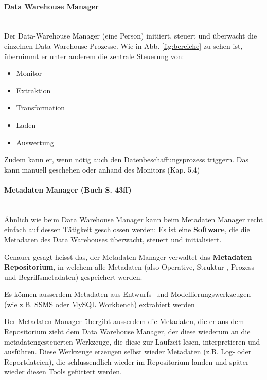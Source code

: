 \documentclass[a4paper, 11pt, nofootinbib]{article}
\begin{document}
\paragraph{Data Warehouse Manager}\mbox{}\\
Der Data-Warehouse Manager (eine Person) initiiert, steuert und überwacht die einzelnen Data Warehouse Prozesse. Wie in Abb. \ref{fig:bereiche} zu sehen ist, übernimmt er unter anderem die zentrale Steuerung von: 

\begin{itemize}
	\item Monitor
	\item Extraktion
	\item Transformation
	\item Laden
	\item Auswertung
\end{itemize}

Zudem kann er, wenn nötig auch den Datenbeschaffungsprozess triggern. Das kann manuell geschehen oder anhand des Monitors (Kap. 5.4)

\paragraph{Metadaten Manager (Buch S. 43ff)}\mbox{}\\
Ähnlich wie beim Data Warehouse Manager kann beim Metadaten Manager recht einfach auf dessen Tätigkeit geschlossen werden: Es ist eine \textbf{Software}, die die Metadaten des Data Warehouses überwacht, steuert und initialisiert.

\vspace{10px}

\noindent Genauer gesagt heisst das, der Metadaten Manager verwaltet das \textbf{Metadaten Repositorium}, in welchem alle Metadaten (also Operative, Struktur-, Prozess- und Begriffsmetadaten) gespeichert werden.

Es können ausserdem Metadaten aus Entwurfs- und Modellierungswerkzeugen (wie z.B. SSMS oder MySQL Workbench) extrahiert werden

\vspace{10px}

\noindent Der Metadaten Manager übergibt ausserdem die Metadaten, die er aus dem Repositorium zieht dem Data Warehouse Manager, der diese wiederum an die metadatengesteuerten Werkzeuge, die diese zur Laufzeit lesen, interpretieren und ausführen. Diese Werkzeuge erzeugen selbst wieder Metadaten (z.B. Log- oder Reportdateien), die schlussendlich wieder im Repositorium landen und später wieder diesen Tools gefüttert werden. 
\end{document}
